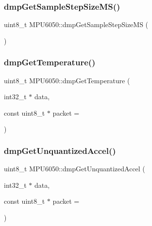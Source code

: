 \mbox{\label{classMPU6050_a4f08483cb6b6f9917f602290fa4aee1b}} 
\subsubsection{\texorpdfstring{dmpGetSampleStepSizeMS()}{dmpGetSampleStepSizeMS()}}
{\footnotesize\ttfamily uint8\+\_\+t M\+P\+U6050\+::dmp\+Get\+Sample\+Step\+Size\+MS (\begin{DoxyParamCaption}{ }\end{DoxyParamCaption})}

\mbox{\label{classMPU6050_a799f73f0eb419057b5fe2a02d7f1905d}} 
\subsubsection{\texorpdfstring{dmpGetTemperature()}{dmpGetTemperature()}}
{\footnotesize\ttfamily uint8\+\_\+t M\+P\+U6050\+::dmp\+Get\+Temperature (\begin{DoxyParamCaption}\item[{int32\+\_\+t $\ast$}]{data,  }\item[{const uint8\+\_\+t $\ast$}]{packet = {} }\end{DoxyParamCaption})}

\mbox{\label{classMPU6050_a1232c8fed01938c6137df40fa2436d31}} 
\subsubsection{\texorpdfstring{dmpGetUnquantizedAccel()}{dmpGetUnquantizedAccel()}\hspace{0.1cm}{\footnotesize\ttfamily [1/3]}}
{\footnotesize\ttfamily uint8\+\_\+t M\+P\+U6050\+::dmp\+Get\+Unquantized\+Accel (\begin{DoxyParamCaption}\item[{int32\+\_\+t $\ast$}]{data,  }\item[{const uint8\+\_\+t $\ast$}]{packet = {} }\end{DoxyParamCaption})}

